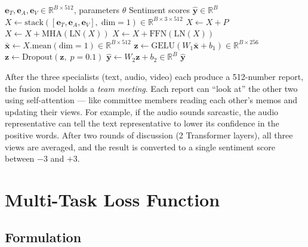 \documentclass[12pt,a4paper]{article}
\theoremstyle{definition}
\begin{document}
\begin{algorithm}[H]
\caption{\textsc{MultimodalFusionTransformer.forward} — Forward Pass}
\label{alg:forward}
\begin{algorithmic}[1]
\Require $\mathbf{e}_T, \mathbf{e}_A, \mathbf{e}_V \in \mathbb{R}^{B \times 512}$, parameters $\theta$
\Ensure Sentiment scores $\hat{\mathbf{y}} \in \mathbb{R}^B$
\State $X \gets \text{stack}([\mathbf{e}_T, \mathbf{e}_A, \mathbf{e}_V],\; \text{dim}=1) \in \mathbb{R}^{B \times 3 \times 512}$
\State $X \gets X + P$ 
  \State $X \gets X + \text{MHA}(\text{LN}(X))$ 
  \State $X \gets X + \text{FFN}(\text{LN}(X))$ 
\EndFor
\State $\bar{\mathbf{x}} \gets X.\text{mean}(\text{dim}=1) \in \mathbb{R}^{B \times 512}$ 
\State $\mathbf{z} \gets \text{GELU}(W_1 \bar{\mathbf{x}} + b_1) \in \mathbb{R}^{B \times 256}$
\State $\mathbf{z} \gets \text{Dropout}(\mathbf{z},\; p=0.1)$
\State $\hat{\mathbf{y}} \gets W_2 \mathbf{z} + b_2 \in \mathbb{R}^{B}$ 
\State \Return $\hat{\mathbf{y}}$
\end{algorithmic}
\end{algorithm}

\begin{laymanbox}
After the three specialists (text, audio, video) each produce a 512-number report, the fusion model holds a \emph{team meeting}. Each report can ``look at'' the other two using self-attention — like committee members reading each other's memos and updating their views. For example, if the audio sounds sarcastic, the audio representative can tell the text representative to lower its confidence in the positive words. After two rounds of discussion (2 Transformer layers), all three views are averaged, and the result is converted to a single sentiment score between $-3$ and $+3$.
\end{laymanbox}

\section{Multi-Task Loss Function}

\subsection{Formulation}
\end{document}
